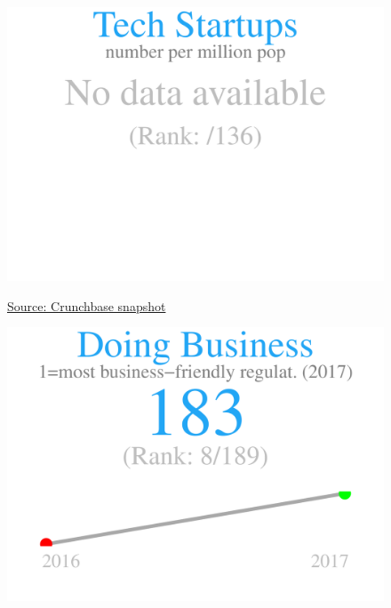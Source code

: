 \documentclass{article}\usepackage[]{graphicx}\usepackage[]{color}
\makeatletter
\def\maxwidth{ %
  \ifdim\Gin@nat@width>\linewidth
    \linewidth
  \else
    \Gin@nat@width
  \fi
}
\makeatother
\begin{document}
\begin{figure}
\begin{minipage}[t]{0.99\textwidth}
\begin{minipage}[t]{0.56\textwidth}
\begin{minipage}[c]{0.30\textwidth}
\hfill{}\includegraphics[width=\maxwidth]{figure/figure_sparkline1-1} 



    \vspace{-2ex}
    \hspace{2ex}\tiny{\href{https://data.crunchbase.com/docs/2013-snapshot}{\textcolor[HTML]{22A6F5}{Source: Crunchbase snapshot}}}
    \vspace{3ex}
    \end{minipage}
    \begin{minipage}[c]{0.30\textwidth}


{\centering \includegraphics[width=\maxwidth]{figure/figure_sparkline2-1} 

}




\end{minipage}
\end{minipage}
\end{minipage}
\end{figure}
\end{document}
